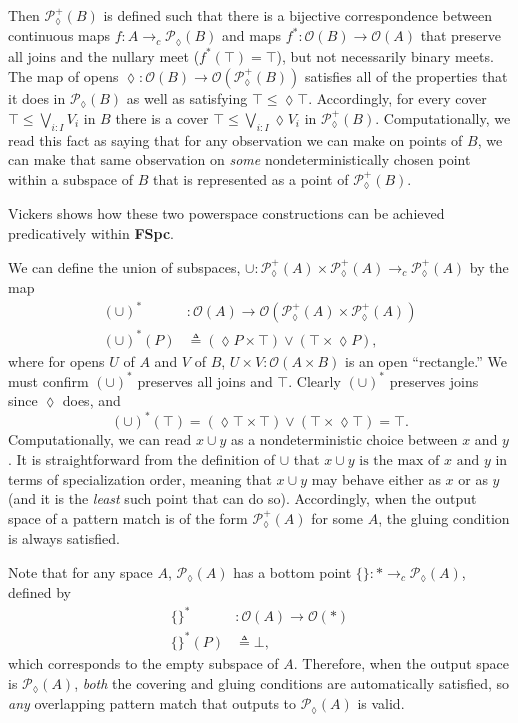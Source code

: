 \documentclass[conference]{IEEEtran}
\newcommand{\PLower}{\mathcal{P}_\lozenge}
\newcommand{\cto}{\to_c}
\newcommand{\One}{\ast}
\newcommand{\Open}[1]{\mathcal{O}({#1})}
\newcommand{\isthemaxof}[3]{{#1}\text{ is the max of }{#2}\text{ and }{#3}}
\newcommand{\iimg}[1]{{#1}^*}
\begin{document}
Then $\PLower^+(B)$ is defined such that there is a bijective correspondence between continuous maps $f : A \cto \PLower(B)$ and maps $\iimg{f} : \Open{B} \to \Open{A}$ that preserve all joins and the nullary meet ($\iimg{f}(\top) = \top$), but not necessarily binary meets. The map of opens $\lozenge : \Open{B} \to \Open{\PLower^+(B)}$ satisfies all of the properties that it does in $\PLower(B)$ as well as satisfying
$\top \le \lozenge \top$. Accordingly, for every cover $\top \le \bigvee_{i : I} V_i$ in $B$ there is a cover $\top \le \bigvee_{i : I} \lozenge V_i$ in $\PLower^+(B)$. Computationally, we read this fact as saying that for any observation we can make on points of $B$, we can make that same observation on \emph{some} nondeterministically chosen point within a subspace of $B$ that is represented as a point of $\PLower^+(B)$.

Vickers \cite{vickersdoublepowerlocale} shows how these two powerspace constructions can be achieved predicatively within \textbf{FSpc}. 

We can define the union of subspaces, $
\cup : \PLower^+(A) \times \PLower^+(A) \cto \PLower^+(A)$ by the map
\begin{align*}
\iimg{(\cup)} &: \Open{A} \to \Open{\PLower^+(A) \times \PLower^+(A)}
\\ \iimg{(\cup)}(P) &\triangleq (\lozenge P \times \top) \vee (\top \times \lozenge P),
\end{align*}
where for opens $U$ of $A$ and $V$ of $B$, $U \times V : \Open{A \times B}$ is an open ``rectangle.''
We must confirm $\iimg{(\cup)}$ preserves all joins and $\top$. Clearly $\iimg{(\cup)}$ preserves joins since $\lozenge$ does, and
\[
\iimg{(\cup)}(\top) = (\lozenge \top \times \top) \vee (\top \times \lozenge \top) = \top.
\]
Computationally, we can read $x \cup y$ as a nondeterministic choice between $x$ and $y$.
It is straightforward from the definition of $\cup$ that $\isthemaxof{x \cup y}{x}{y}$ in terms of specialization order, meaning that $x \cup y$ may behave either as $x$ or as $y$ (and it is the \emph{least} such point that can do so). Accordingly, when the output space of a pattern match is of the form $\PLower^+(A)$ for some $A$, the gluing condition is always satisfied.

Note that for any space $A$, $\PLower(A)$ has a bottom point $\{ \} : \One \cto \PLower(A)$, defined by
\begin{align*}
\iimg{\{\}} &: \Open{A} \to \Open{\One}
\\ \iimg{\{ \}}(P) &\triangleq \bot,
\end{align*}
which corresponds to the empty subspace of $A$. Therefore, when the output space is $\PLower(A)$, \emph{both} the covering and gluing conditions are automatically satisfied, so \emph{any} overlapping pattern match that outputs to $\PLower(A)$ is valid.
\end{document}

